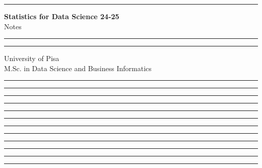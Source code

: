 \documentclass[11pt]{article}
\newcommand{\separate}{\begin{center}\textcolor{NavyBlue}{\rule{16cm}{1mm}}\end{center}}
\begin{document}
\begin{titlepage}
    \hrule
    \vspace{15pt}
    \begin{center}
        \Huge{\textbf{\Huge \textbf{Statistics for Data Science 24-25}} \\ Notes}\\
    \end{center}
    \vspace{15pt}
    \hrule
    \vfill
    \hrule
    \begin{center}
        \Large University of Pisa \\ M.Sc. in Data Science and Business Informatics
    \end{center}
\end{titlepage}

\tableofcontents
\clearpage


\separate
\separate
\separate
\separate
\separate
\separate
\separate
\separate
\separate
\separate
\separate
\separate
\end{document}
